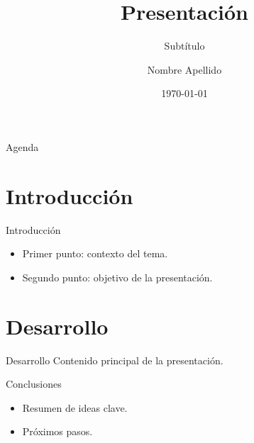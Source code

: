 \documentclass[aspectratio=169]{beamer}
\title{Presentación}
\subtitle{Subtítulo}
\author{Nombre Apellido}
\institute{Institución}
\date{\today}
\begin{document}
\begin{frame}
  \titlepage
\end{frame}

\begin{frame}{Agenda}
  \tableofcontents
\end{frame}

\section{Introducción}

\begin{frame}{Introducción}
  \begin{itemize}
    \item Primer punto: contexto del tema.
    \item Segundo punto: objetivo de la presentación.
  \end{itemize}
\end{frame}

\section{Desarrollo}

\begin{frame}{Desarrollo}
  Contenido principal de la presentación.
\end{frame}

\begin{frame}{Conclusiones}
  \begin{itemize}
    \item Resumen de ideas clave.
    \item Próximos pasos.
  \end{itemize}
\end{frame}
\end{document}
